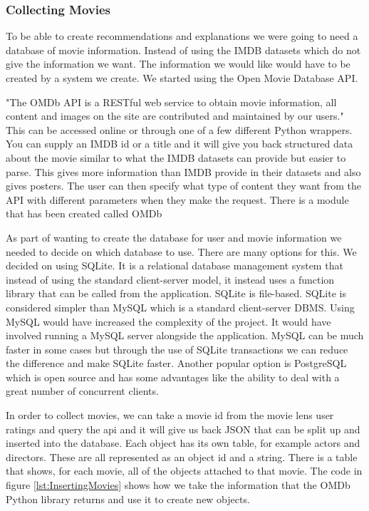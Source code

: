                 \subsubsection{Collecting Movies}\label{sec:CollectingMovies}
                    To be able to create recommendations and explanations we were going to need a database of movie information. Instead of using the IMDB datasets which do not give the information we want. The information we would like would have to be created by a system we create.  We started using the Open Movie Database API. 

                    "The OMDb API is a RESTful web service to obtain movie information, all content and images on the site are contributed and maintained by our users."\cite{OpenMovieDatabase} This can be accessed online or through one of a few different Python wrappers. You can supply an IMDB id or a title and it will give you back structured data about the movie similar to what the IMDB datasets can provide but easier to parse. This gives more information than IMDB provide in their datasets and also gives posters. The user can then specify what type of content they want from the API with different parameters when they make the request. There is a module that has been created called OMDb \cite{pythonOmdbApi}

                    As part of wanting to create the database for user and movie information we needed to decide on which database to use. There are many options for this. We decided on using SQLite. It is a relational database management system that instead of using the standard client-server model, it instead uses a function library that can be called from the application. SQLite is file-based. SQLite is considered simpler than MySQL which is a standard client-server DBMS. Using MySQL would have increased the complexity of the project. It would have involved running a MySQL server alongside the application. MySQL can be much faster in some cases but through the use of SQLite transactions we can reduce the difference and make SQLite faster. Another popular option is PostgreSQL which is open source and has some advantages like the ability to deal with a great number of concurrent clients. 

                    In order to collect movies, we can take a movie id from the movie lens user ratings and query the api and it will give us back JSON that can be split up and inserted into the database. Each object has its own table, for example actors and directors. These are all represented as an object id and a string. There is a table that shows, for each movie, all of the objects attached to that movie. The code in figure \ref{lst:InsertingMovies} shows how we take the information that the OMDb Python library returns and use it to create new objects. 

